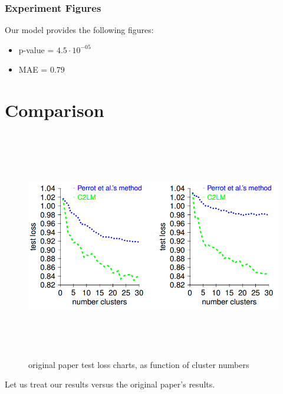 	\subsubsection{Experiment Figures}	
	Our model provides the following figures:	
	\begin{itemize}
	\item 	p-value = $4.5 \cdot 10 ^{-05}$
	\item 	MAE = $0.79$
	
	\end{itemize}


\section{Comparison}

\begin{figure}[H] 
	\includegraphics[width=\linewidth,height=10cm,keepaspectratio]{Figures/orig_paper_charts}
	\caption[orig res]
	{original paper test loss charts, as function of cluster numbers}
	\label{original paper results}			
\end{figure}


Let us treat our results versus the original paper's results.\\

